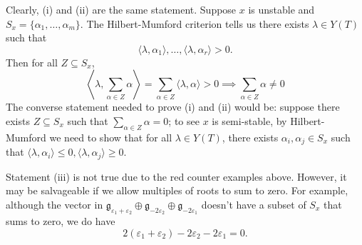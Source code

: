\documentclass[12pt]{amsart}
\newcommand{\g}{\mathfrak{g}}
\theoremstyle{remark}
\theoremstyle{remark}
\theoremstyle{remark}
\begin{document}
Clearly, (i) and (ii) are the same statement.
Suppose $x$ is unstable and $S_x = \{\alpha_1, \ldots, \alpha_m\}$.
The Hilbert-Mumford criterion tells us there exists $\lambda \in Y(T)$ such that 
$$\langle \lambda, \alpha_1 \rangle, \ldots, \langle \lambda, \alpha_r \rangle > 0.$$
Then for all $Z \subseteq S_x$,
$$\left\langle\lambda, \sum_{\alpha \in Z} \alpha \right \rangle
= \sum_{\alpha \in Z} \langle \lambda, \alpha \rangle > 0 \implies \sum_{\alpha \in Z} \alpha \ne 0$$
The converse statement needed to prove (i) and (ii) would be: 
suppose there exists $Z \subseteq S_x$ such that $\sum_{\alpha \in Z} \alpha = 0$; to see $x$ is semi-stable, by Hilbert-Mumford we need to show that for all $\lambda \in Y(T)$, there exists $\alpha_i, \alpha_j \in S_x$ such that $\langle \lambda, \alpha_i \rangle \le 0, \langle \lambda, \alpha_j \rangle \ge 0$.

Statement (iii) is not true due to the red counter examples above.
However, it may be salvageable if we allow multiples of roots to sum to zero.
For example, although the vector in $\g_{\varepsilon_1+\varepsilon_2} \oplus \g_{-2 \varepsilon_2} \oplus \g_{-2\varepsilon_1}$ doesn't have a subset of $S_x$ that sums to zero, we do have
$$2 (\varepsilon_1+\varepsilon_2) -2 \varepsilon_2 -2\varepsilon_1 = 0.$$
\end{document}
